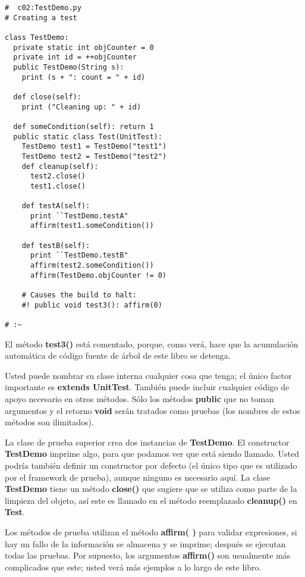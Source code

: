 \begin{lstlisting}
#  c02:TestDemo.py 
# Creating a test 

class TestDemo: 
  private static int objCounter = 0 
  private int id = ++objCounter 
  public TestDemo(String s): 
    print (s + ": count = " + id)
    
  def close(self): 
    print ("Cleaning up: " + id) 
    
  def someCondition(self): return 1  
  public static class Test(UnitTest): 
    TestDemo test1 = TestDemo("test1") 
    TestDemo test2 = TestDemo("test2") 
    def cleanup(self):  
      test2.close() 
      test1.close() 
      
    def testA(self):  
      print ``TestDemo.testA"
      affirm(test1.someCondition()) 
      
    def testB(self):  
      print ``TestDemo.testB"
      affirm(test2.someCondition()) 
      affirm(TestDemo.objCounter != 0) 
      
    # Causes the build to halt: 
    #! public void test3(): affirm(0)  
    
# :~ 
\end{lstlisting}

El método \textbf{test3()} está comentado, porque, como verá, hace que la acumulación automática de código fuente de árbol de este libro se detenga.  \newline

Usted puede nombrar su clase interna cualquier cosa que tenga; el único factor importante es \textbf{extends UnitTest}. También puede incluir cualquier código de apoyo necesario en otros métodos. Sólo los métodos \textbf{public} que no toman argumentos y el retorno \textbf{void} serán tratados como pruebas (los nombres de estos métodos son ilimitados).  \newline

La clase de prueba superior crea dos instancias de \textbf{TestDemo}. El constructor \textbf{TestDemo}  imprime algo, para que podamos ver que está siendo llamado. Usted podría también definir un constructor por defecto (el único tipo que es utilizado por el framework de prueba), aunque ninguno es necesario aquí. La clase \textbf{TestDemo} tiene un método \textbf{close()} que sugiere que se utiliza como parte de la limpieza del objeto, así este es llamado en el método reemplazado \textbf{cleanup()} en \textbf{Test}.   \newline

Los métodos de prueba utilizan el método \textbf{affirm( )} para validar expresiones, si hay un fallo de la información se almacena y se imprime; después se ejecutan todas las pruebas. Por supuesto, los argumentos \textbf{affirm()} son usualmente más complicados que este; usted verá más ejemplos a lo largo de este libro.    \newline

